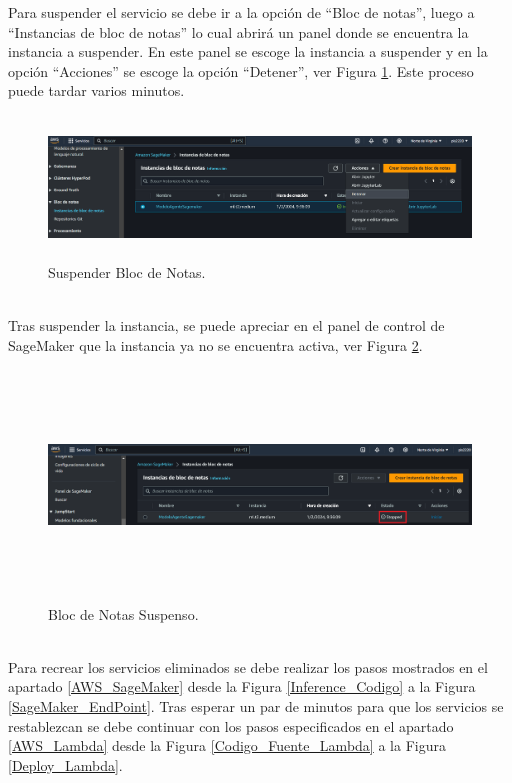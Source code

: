 \documentclass[a4paper,10pt, oneside, titlepage]{article}
\begin{document}
	\indent Para suspender el servicio se debe ir a la opción de  ``Bloc de notas'', luego a ``Instancias de bloc de notas'' lo cual abrirá un panel donde se encuentra la instancia a suspender. En este panel se escoge la instancia a suspender y en la opción ``Acciones'' se escoge la opción ``Detener'', ver Figura \ref{Suspender_Bloc_Notas}. Este proceso puede tardar varios minutos.
	\begin{figure}[!h]
		\centering
		\includegraphics[width = 1\linewidth, height = 3.8cm]{Suspender_Bloc_Notas.png}
		\caption{Suspender Bloc de Notas.}
		\label{Suspender_Bloc_Notas}
	\end{figure} \\
	\indent Tras suspender la instancia, se puede apreciar en el panel de control de SageMaker que la instancia ya no se encuentra activa, ver Figura \ref{Bloc_Notas_Suspenso}.
	\begin{figure}[!h]
		\centering
		\includegraphics[width = 1\linewidth, height = 6.1cm]{Bloc_Notas_Suspenso.png}
		\caption{Bloc de Notas Suspenso.}
		\label{Bloc_Notas_Suspenso}
	\end{figure} \\
	\indent Para recrear los servicios eliminados se debe realizar los pasos mostrados en el apartado \ref{AWS_SageMaker} desde la Figura \ref{Inference_Codigo} a la Figura \ref{SageMaker_EndPoint}. Tras esperar un par de minutos para que los servicios se restablezcan se debe continuar con los pasos especificados en el apartado \ref{AWS_Lambda} desde la Figura \ref{Codigo_Fuente_Lambda} a la Figura \ref{Deploy_Lambda}.
	
\end{document}
